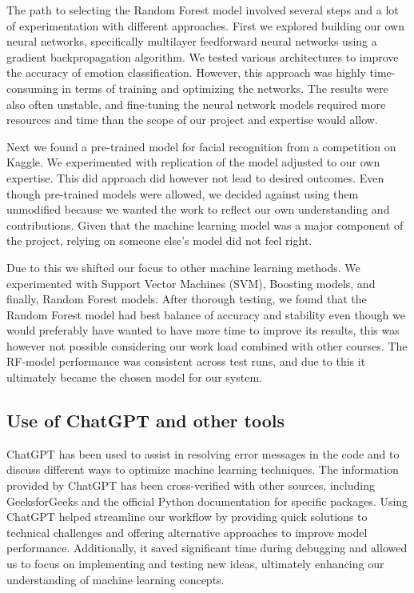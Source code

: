 \documentclass[conference]{IEEEtran}
\begin{document}
The path to selecting the Random Forest model involved several steps and a lot of experimentation with different approaches. First we explored building our own neural networks, specifically multilayer feedforward neural networks using a gradient backpropagation algorithm. We tested various architectures to improve the accuracy of emotion classification. However, this approach was highly time-consuming in terms of training and optimizing the networks. The results were also often unstable, and fine-tuning the neural network models required more resources and time than the scope of our project and expertise would allow.


Next we found a pre-trained model for facial recognition from a competition on Kaggle\cite{kaggle}. We experimented with replication of the model adjusted to our own expertise. This did approach did however not lead to desired outcomes. Even though pre-trained models were allowed, we decided against using them unmodified because we wanted the work to reflect our own understanding and contributions. Given that the machine learning model was a major component of the project, relying on someone else’s model did not feel right.

Due to this we shifted our focus to other machine learning methods. We experimented with Support Vector Machines (SVM), Boosting models, and finally, Random Forest models. After thorough testing, we found that the Random Forest model had best balance of accuracy and stability even though we would preferably have wanted to have more time to improve its results, this was however not possible considering our work load combined with other courses. The RF-model performance was consistent across test runs, and due to this it ultimately became the chosen model for our system.
\subsection{Use of ChatGPT and other tools}

ChatGPT has been used to assist in resolving error messages in the code and to discuss different ways to optimize machine learning techniques. The information provided by ChatGPT has been cross-verified with other sources, including GeeksforGeeks and the official Python documentation for specific packages. Using ChatGPT helped streamline our workflow by providing quick solutions to technical challenges and offering alternative approaches to improve model performance. Additionally, it saved significant time during debugging and allowed us to focus on implementing and testing new ideas, ultimately enhancing our understanding of machine learning concepts.
\end{document}

